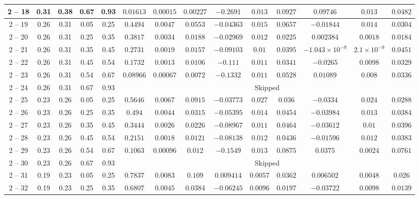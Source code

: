 \begin{longtable}{|*{14}{c|}}
\hline
2 -- 18 & 0.31 & 0.38 & 0.67 & 0.93 & $0.01613$ & $0.00015$ & $0.00227$ & $-0.2691$ & $0.013$ & $0.0927$ & $0.09746$ & $0.013$ & $0.0482$ \\
\hline
2 -- 19 & 0.26 & 0.31 & 0.05 & 0.25 & $0.4494$ & $0.0047$ & $0.0553$ & $-0.04363$ & $0.015$ & $0.0657$ & $-0.01844$ & $0.014$ & $0.0304$ \\
\hline
2 -- 20 & 0.26 & 0.31 & 0.25 & 0.35 & $0.3817$ & $0.0034$ & $0.0188$ & $-0.02969$ & $0.012$ & $0.0225$ & $0.002384$ & $0.0018$ & $0.0184$ \\
\hline
2 -- 21 & 0.26 & 0.31 & 0.35 & 0.45 & $0.2731$ & $0.0019$ & $0.0157$ & $-0.09103$ & $0.01$ & $0.0395$ & $-1.043\times 10^{-9}$ & $2.1\times 10^{-9}$ & $0.0451$ \\
\hline
2 -- 22 & 0.26 & 0.31 & 0.45 & 0.54 & $0.1732$ & $0.0013$ & $0.0106$ & $-0.111$ & $0.011$ & $0.0341$ & $-0.0265$ & $0.0098$ & $0.0329$ \\
\hline
2 -- 23 & 0.26 & 0.31 & 0.54 & 0.67 & $0.08966$ & $0.00067$ & $0.0072$ & $-0.1332$ & $0.011$ & $0.0528$ & $0.01089$ & $0.008$ & $0.0336$ \\
\hline
2 -- 24 & 0.26 & 0.31 & 0.67 & 0.93 & \multicolumn{9}{c|}{Skipped} \\
\hline
2 -- 25 & 0.23 & 0.26 & 0.05 & 0.25 & $0.5646$ & $0.0067$ & $0.0915$ & $-0.03773$ & $0.027$ & $0.036$ & $-0.0334$ & $0.024$ & $0.0288$ \\
\hline
2 -- 26 & 0.23 & 0.26 & 0.25 & 0.35 & $0.494$ & $0.0044$ & $0.0315$ & $-0.05395$ & $0.014$ & $0.0454$ & $-0.03984$ & $0.013$ & $0.0384$ \\
\hline
2 -- 27 & 0.23 & 0.26 & 0.35 & 0.45 & $0.3444$ & $0.0026$ & $0.0226$ & $-0.08967$ & $0.011$ & $0.0464$ & $-0.03612$ & $0.01$ & $0.0396$ \\
\hline
2 -- 28 & 0.23 & 0.26 & 0.45 & 0.54 & $0.2151$ & $0.0018$ & $0.0121$ & $-0.08138$ & $0.012$ & $0.0436$ & $-0.01596$ & $0.012$ & $0.0383$ \\
\hline
2 -- 29 & 0.23 & 0.26 & 0.54 & 0.67 & $0.1063$ & $0.00096$ & $0.012$ & $-0.1549$ & $0.013$ & $0.0875$ & $0.0375$ & $0.0024$ & $0.0761$ \\
\hline
2 -- 30 & 0.23 & 0.26 & 0.67 & 0.93 & \multicolumn{9}{c|}{Skipped} \\
\hline
2 -- 31 & 0.19 & 0.23 & 0.05 & 0.25 & $0.7837$ & $0.0083$ & $0.109$ & $0.009414$ & $0.0057$ & $0.0362$ & $0.006502$ & $0.0048$ & $0.026$ \\
\hline
2 -- 32 & 0.19 & 0.23 & 0.25 & 0.35 & $0.6807$ & $0.0045$ & $0.0384$ & $-0.06245$ & $0.0096$ & $0.0197$ & $-0.03722$ & $0.0098$ & $0.0139$ \\

\end{longtable}
